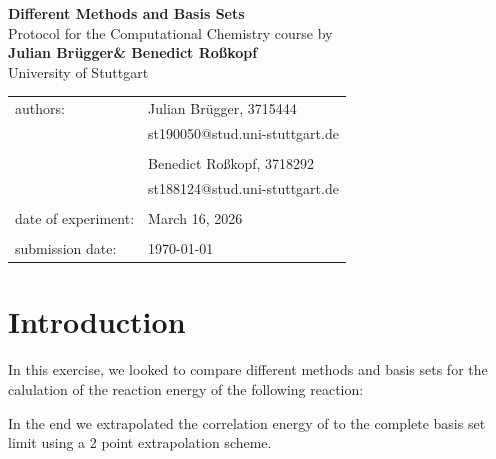 \documentclass[a4paper,12pt]{scrartcl}
\makeatletter
\newcommand{\VERSUCHSDATUM}{March 16, 2026}
\newcommand{\PROTOKOLLDATUM}{\today}
\newcommand{\VerfasserEINS}{Julian Brügger}
\newcommand{\MatNoEINS}{3715444}
\newcommand{\EmailEINS}{st190050@stud.uni-stuttgart.de}
\newcommand{\VerfasserZWEI}{Benedict Roßkopf}
\newcommand{\MatNoZWEI}{3718292}
\newcommand{\EmailZWEI}{st188124@stud.uni-stuttgart.de}
\newcommand{\VERSUCHSNAME}{Different Methods and Basis Sets}
\makeatother
\begin{document}
\begin{titlepage}
\begin{center}
\Huge{\textbf{\VERSUCHSNAME}}\\
\vspace{10mm}
\Large{Protocol for the Computational Chemistry course by \\ \textbf{\VerfasserEINS\;\& \VerfasserZWEI }}\\
\vspace{10mm} 
\Large{University of Stuttgart}\\
\end{center}
\begin{center}
\begin{tabular}{ll}
\large{authors:}        & \large{\VerfasserEINS, \MatNoEINS} \\
                        & \large{\EmailEINS} \\
                        \vspace{2mm}\\
                        & \large{\VerfasserZWEI, \MatNoZWEI} \\
                        & \large{\EmailZWEI} \\						
                        \vspace{0cm}\\
\large{date of experiment:}	& \large{\VERSUCHSDATUM} \\
\vspace{0cm}\\
\large{submission date:} & \large{\PROTOKOLLDATUM}
\end{tabular}
\end{center}
\end{titlepage}

\section{Introduction}

In this exercise, we looked to compare different methods and basis sets for the calulation of the reaction energy of the following reaction:

\begin{center}
\end{center}

In the end we extrapolated the correlation energy of  to the complete basis set limit using a 2 point extrapolation scheme.
\end{document}
